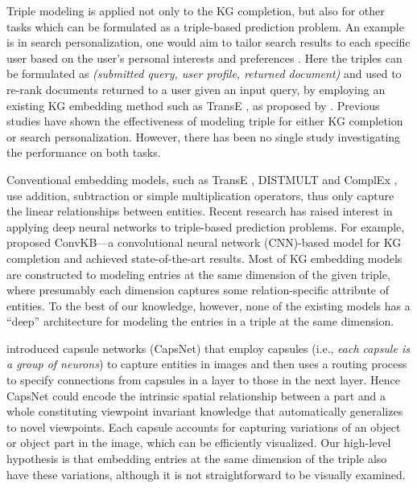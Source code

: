 \documentclass[11pt,a4paper]{article}
\begin{document}
Triple modeling is  applied not only to the KG completion, but also for other tasks which can be formulated as a triple-based prediction problem. An example is in search personalization, one would aim to tailor search results to each specific user based on the user's personal interests and preferences \citep{Teevan2005,Teevan2009,Bennett2012,HarveyB2013,Vu2015,vu2017search}.
Here the triples can be formulated as \textit{(submitted query, user profile, returned document)} and used to re-rank documents returned to a user given an input query, by employing an existing KG embedding method  such as TransE \citep{NIPS2013_5071}, as proposed by \citet{vu2017search}.
Previous studies have shown the effectiveness of modeling triple for either KG completion or search personalization.
However, there has been no single study investigating the performance on both  tasks.


Conventional embedding models, such as TransE \citep{NIPS2013_5071}, DISTMULT \citep{Yang2015} and ComplEx \citep{Trouillon2016}, use addition, subtraction or simple multiplication operators, thus only capture the linear relationships between entities.
Recent research has raised interest in applying deep neural networks to triple-based prediction problems.
For example, \citet{Nguyen2018} proposed ConvKB---a convolutional neural network (CNN)-based model for KG completion and achieved state-of-the-art results. Most of KG embedding models are constructed to modeling entries at the same dimension of the given triple, where presumably each dimension captures some relation-specific attribute of entities.
To the best of our knowledge, however, none of the existing models has a ``deep'' architecture for modeling the entries in a triple at the same dimension.

\citet{sabour2017dynamic} introduced capsule networks (CapsNet) that employ capsules (i.e., \textit{each capsule is a group of neurons}) to capture entities in images and then uses a routing process to specify connections from capsules in a layer to those in the next layer.
Hence CapsNet could encode the intrinsic spatial relationship between a part and a whole constituting viewpoint invariant knowledge that automatically generalizes to novel viewpoints.
Each capsule accounts for capturing variations of an object or object part in the image, which can be efficiently visualized. Our high-level hypothesis is that embedding entries at the same dimension of the triple also have these variations, although it is not straightforward to be visually  examined. 
\end{document}
